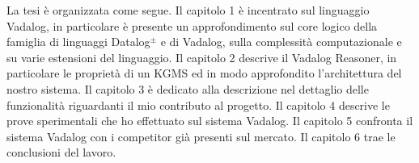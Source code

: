 La tesi è organizzata come segue. \newline \newline
Il capitolo 1 è incentrato sul linguaggio Vadalog, in particolare è presente un approfondimento sul core logico della famiglia di linguaggi Datalog$^\pm$ e di Vadalog, sulla complessità computazionale e su varie estensioni del linguaggio. \newline \newline
Il capitolo 2 descrive il Vadalog Reasoner, in particolare le proprietà di un KGMS ed in modo approfondito l'architettura del nostro sistema. \newline \newline
Il capitolo 3 è dedicato alla descrizione nel dettaglio delle funzionalità riguardanti il mio contributo al progetto. \newline \newline
Il capitolo 4 descrive le prove sperimentali che ho effettuato sul sistema Vadalog. \newline \newline
Il capitolo 5 confronta il sistema Vadalog con i competitor già presenti sul mercato. \newline \newline
Il capitolo 6 trae le conclusioni del lavoro.

